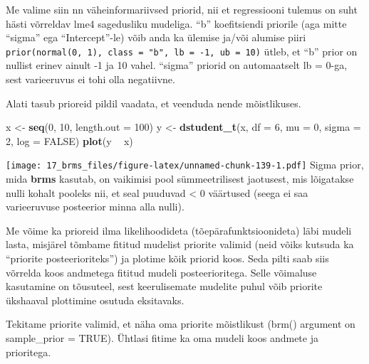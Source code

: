 \documentclass[]{article}
\newenvironment{Shaded}{\begin{snugshade}}{\end{snugshade}}
\newcommand{\KeywordTok}[1]{\textcolor[rgb]{0.13,0.29,0.53}{\textbf{#1}}}
\newcommand{\DataTypeTok}[1]{\textcolor[rgb]{0.13,0.29,0.53}{#1}}
\newcommand{\DecValTok}[1]{\textcolor[rgb]{0.00,0.00,0.81}{#1}}
\newcommand{\StringTok}[1]{\textcolor[rgb]{0.31,0.60,0.02}{#1}}
\newcommand{\OtherTok}[1]{\textcolor[rgb]{0.56,0.35,0.01}{#1}}
\newcommand{\OperatorTok}[1]{\textcolor[rgb]{0.81,0.36,0.00}{\textbf{#1}}}
\newcommand{\NormalTok}[1]{#1}
\begin{document}
Me valime siin nn väheinformariivsed priorid, nii et regressiooni
tulemus on suht hästi võrreldav lme4 sagedusliku mudeliga. ``b''
koefitsiendi priorile (aga mitte ``sigma'' ega ``Intercept''-le) võib
anda ka ülemise ja/või alumise piiri
\texttt{prior(normal(0,\ 1),\ class\ =\ "b",\ lb\ =\ -1,\ ub\ =\ 10)}
ütleb, et ``b'' prior on nullist erinev ainult -1 ja 10 vahel. ``sigma''
priorid on automaatselt lb = 0-ga, sest varieeruvus ei tohi olla
negatiivne.

Alati tasub prioreid pildil vaadata, et veenduda nende mõistlikuses.

\begin{Shaded}
\begin{Highlighting}[]
\NormalTok{x <-}\StringTok{ }\KeywordTok{seq}\NormalTok{(}\DecValTok{0}\NormalTok{, }\DecValTok{10}\NormalTok{, }\DataTypeTok{length.out =} \DecValTok{100}\NormalTok{)}
\NormalTok{y <-}\StringTok{ }\KeywordTok{dstudent_t}\NormalTok{(x, }\DataTypeTok{df =} \DecValTok{6}\NormalTok{, }\DataTypeTok{mu =} \DecValTok{0}\NormalTok{, }\DataTypeTok{sigma =} \DecValTok{2}\NormalTok{, }\DataTypeTok{log =} \OtherTok{FALSE}\NormalTok{)}
\KeywordTok{plot}\NormalTok{(y }\OperatorTok{~}\StringTok{ }\NormalTok{x)}
\end{Highlighting}
\end{Shaded}

\texttt{[image: 17\_brms\_files/figure-latex/unnamed-chunk-139-1.pdf]}
Sigma prior, mida \textbf{brms} kasutab, on vaikimisi pool
sümmeetrilisest jaotusest, mis lõigatakse nulli kohalt pooleks nii, et
seal puuduvad \textless{} 0 väärtused (seega ei saa varieeruvuse
posteerior minna alla nulli).

Me võime ka prioreid ilma likelihoodideta (tõepärafunktsioonideta) läbi
mudeli lasta, misjärel tõmbame fititud mudelist priorite valimid (neid
võiks kutsuda ka ``priorite posteerioriteks'') ja plotime kõik priorid
koos. Seda pilti saab siis võrrelda koos andmetega fititud mudeli
posteerioritega. Selle võimaluse kasutamine on tõusuteel, sest
keerulisemate mudelite puhul võib priorite ükshaaval plottimine osutuda
eksitavaks.

Tekitame priorite valimid, et näha oma priorite mõistlikust (brm()
argument on sample\_prior = TRUE). Ühtlasi fitime ka oma mudeli koos
andmete ja prioritega.
\end{document}
